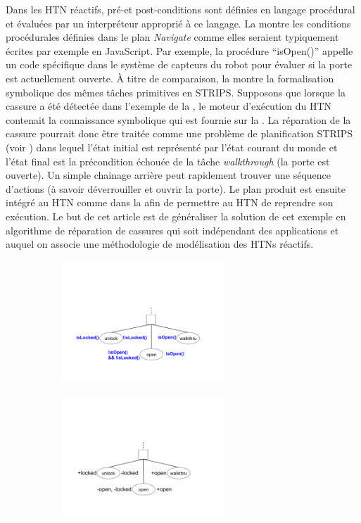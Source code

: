 \documentclass[a4paper,twoside,french]{article}
\begin{document}
	
		\par Dans les HTN réactifs, pré-et post-conditions sont définies en langage procédural et évaluées par un interpréteur approprié à ce langage. La  montre les  conditions procédurales définies dans le plan {\em Navigate} comme elles seraient typiquement écrites par exemple en JavaScript. Par exemple, la procédure ``isOpen()'' appelle un code spécifique dans le système de capteurs du robot pour évaluer si la porte est actuellement ouverte. À titre de comparaison, la  montre la formalisation symbolique des mêmes tâches primitives en STRIPS. 
		Supposons que lorsque la cassure a été détectée dans l'exemple de la , le moteur d'exécution du HTN contenait la connaissance symbolique qui est fournie sur la . La réparation de la cassure pourrait donc être traitée comme une problème de planification STRIPS (voir ) dans lequel l'état initial est représenté par l'état courant du monde et l'état final est la précondition échouée de la tâche {\em walkthrough} (la porte est ouverte). Un simple chainage arrière peut rapidement trouver une séquence d'actions (à savoir déverrouiller et ouvrir la porte). Le plan produit est ensuite intégré au HTN comme dans la  afin de permettre au HTN de reprendre son exécution.  Le but de cet article est de généraliser la solution de cet exemple en algorithme de réparation de cassures qui soit indépendant des applications et auquel on associe une méthodologie de modélisation des HTNs réactifs.
		
			\begin{figure}[t]
				\centering
				\begin{subfigure}{2.3in}
					\centerline{\includegraphics[width=2.4in]{figs/procedures}}
					\vskip 8pt 
				\end{subfigure}
				\hfill
				\begin{subfigure}{2.3in}
					\centerline{\includegraphics[width=2.4in]{figs/features}}
					\vskip 8pt 
				\end{subfigure}
				\vskip 8pt
			\end{figure}
	
\end{document}
